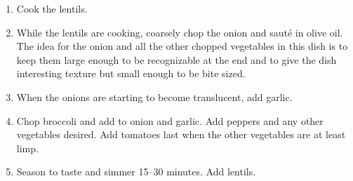 
\begin{ingredients}
\end{ingredients}


\begin{recipe}
  \begin{enumerate}

  \item Cook the lentils.

  \item While the lentils are cooking, coarsely chop the onion and
    saut\'e in olive oil.  The idea for the onion and all the other
    chopped vegetables in this dish is to keep them large enough to be
    recognizable at the end and to give the dish interesting texture
    but small enough to be bite sized.

  \item When the onions are starting to become translucent, add garlic.

  \item Chop broccoli and add to onion and garlic.  Add peppers and
    any other vegetables desired.  Add tomatoes last when the other
    vegetables are at least limp.

  \item Season to taste and simmer 15--30 minutes.  Add lentils.

  \end{enumerate}
\end{recipe}

